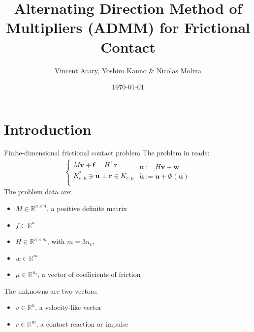 \documentclass[8pt,red]{beamer}
\title{Alternating Direction Method of Multipliers (ADMM) for Frictional Contact}
\author{Vincent Acary, Yoshiro Kanno \& Nicolas Molina}
\date{\today }
\theoremstyle{plain}
\theoremstyle{definition}
\theoremstyle{remark}
\renewcommand{\Re}{\ensuremath{\mathbb{R}}}
\newcommand{\bi}[1]{\ensuremath{\boldsymbol{#1}}}
\begin{document}
{
}


\section{Introduction}
\begin{frame}{Finite-dimensional frictional contact problem}
The problem in \citep{Acary2013} reads:
\begin{align}
	\begin{cases}
	M \bi{v} + \bi{f} = H^{\top} \bi{r}  \\
	K_{e,\mu}^{*}\ni \tilde{\bi{u}} \perp \bi{r} \in K_{e,\mu} \\
	\end{cases}
	\begin{array}{l}
	\bi{u} := H \bi{v} + \bi{w} \\
	\tilde{\bi{u}} := \bi{u} + \Phi(\bi{u})
	\end{array}
	\label{CF.complementary}
\end{align}
The problem data are:
\begin{itemize}
\item $M \in \Re^{n \times n}$, a positive definite matrix 
\item $f \in \Re^{n}$
\item $H \in \Re^{n \times m}$, with $m = 3n_{c}$,
\item $w \in \Re^{m}$
\item $\mu \in \Re^{n_{c}}$, a vector of coefficients of friction 
\end{itemize}
The unknowns are two vectors:
\begin{itemize}
\item $v \in \Re^{n}$, a velocity-like vector
\item $r \in \Re^{m}$, a contact reaction or impulse
\end{itemize}
\end{frame}
\end{document}
